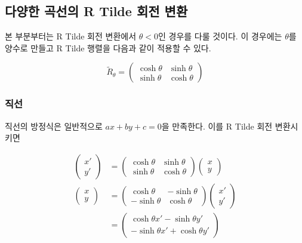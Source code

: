 \documentclass{thesis-SJ}
\begin{document}
\subsection{다양한 곡선의 R Tilde 회전 변환}

본 부분부터는 R Tilde 회전 변환에서 $\theta<0$인 경우를 다룰 것이다. 이 경우에는 $\theta$를 양수로 만들고 R Tilde 행렬을 다음과 같이 적용할 수 있다.

\begin{equation*}
\tilde{R}_\theta = \begin{pmatrix}
\cosh \theta & \sinh \theta \\
\sinh \theta & \cosh \theta 
\end{pmatrix}
\end{equation*}
\subsubsection{직선}
직선의 방정식은 일반적으로 $ax+by+c=0$을 만족한다. 이를 R Tilde 회전 변환시키면

\begin{align*}
\begin{pmatrix}
x' \\ y'
\end{pmatrix} &= \begin{pmatrix}\cosh{\theta} & \sinh{\theta} \\ \sinh{\theta} & \cosh{\theta} \end{pmatrix} \begin{pmatrix}
x \\ y
\end{pmatrix} \\
\begin{pmatrix}
x \\ y
\end{pmatrix} &=
\begin{pmatrix}
\cosh{\theta} & -\sinh{\theta} \\ -\sinh{\theta} & \cosh{\theta}
\end{pmatrix}  \begin{pmatrix}
x' \\ y'
\end{pmatrix} \\
&= \begin{pmatrix}
\cosh{\theta} x' - \sinh{\theta} y'\\ -\sinh{\theta} x' +\cosh{\theta} y'
\end{pmatrix}
\end{align*}
\end{document}

